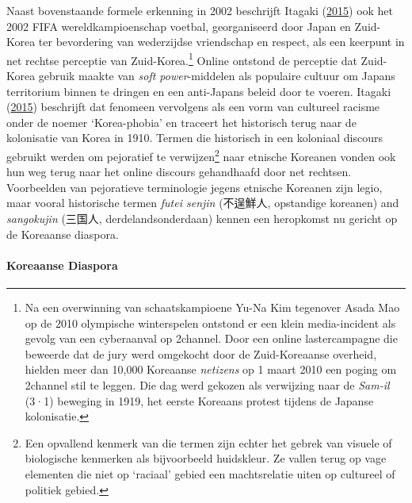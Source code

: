 \documentclass[10.5pt,dutch,]{article}
\let\oldparagraph\paragraph
\renewcommand{\paragraph}[1]{\oldparagraph{#1}\mbox{}}
\begin{document}
Naast bovenstaande formele erkenning in 2002 beschrijft Itagaki
(\protect\hyperlink{ref-itagakiux5fanatomyux5f2015}{2015}) ook het 2002
FIFA wereldkampioenschap voetbal, georganiseerd door Japan en Zuid-Korea
ter bevordering van wederzijdse vriendschap en respect, als een keerpunt
in net rechtse perceptie van Zuid-Korea.\footnote{Na een overwinning van
  schaatskampioene Yu-Na Kim tegenover Asada Mao op de 2010 olympische
  winterspelen ontstond er een klein media-incident als gevolg van een
  cyberaanval op 2channel. Door een online lastercampagne die beweerde
  dat de jury werd omgekocht door de Zuid-Koreaanse overheid, hielden
  meer dan 10,000 Koreaanse \emph{netizens} op 1 maart 2010 een poging
  om 2channel stil te leggen. Die dag werd gekozen als verwijzing naar
  de \emph{Sam-il} (3·1) beweging in 1919, het eerste Koreaans protest
  tijdens de Japanse kolonisatie.} Online ontstond de perceptie dat
Zuid-Korea gebruik maakte van \emph{soft power}-middelen als populaire
cultuur om Japans territorium binnen te dringen en een anti-Japans
beleid door te voeren. Itagaki
(\protect\hyperlink{ref-itagakiux5fanatomyux5f2015}{2015}) beschrijft
dat fenomeen vervolgens als een vorm van cultureel racisme onder de
noemer `Korea-phobia' en traceert het historisch terug naar de
kolonisatie van Korea in 1910. Termen die historisch in een koloniaal
discours gebruikt werden om pejoratief te verwijzen\footnote{Een
  opvallend kenmerk van die termen zijn echter het gebrek van visuele of
  biologische kenmerken als bijvoorbeeld huidskleur. Ze vallen terug op
  vage elementen die niet op `raciaal' gebied een machtsrelatie uiten op
  cultureel of politiek gebied.} naar etnische Koreanen vonden ook hun
weg terug naar het online discours gehandhaafd door net rechtsen.
Voorbeelden van pejoratieve terminologie jegens etnische Koreanen zijn
legio, maar vooral historische termen \emph{futei senjin} (不逞鮮人,
opstandige koreanen) and \emph{sangokujin} (三国人, derdelandsonderdaan)
kennen een heropkomst nu gericht op de Koreaanse diaspora.

\paragraph{Koreaanse Diaspora}\label{koreaanse-diaspora}
\end{document}
